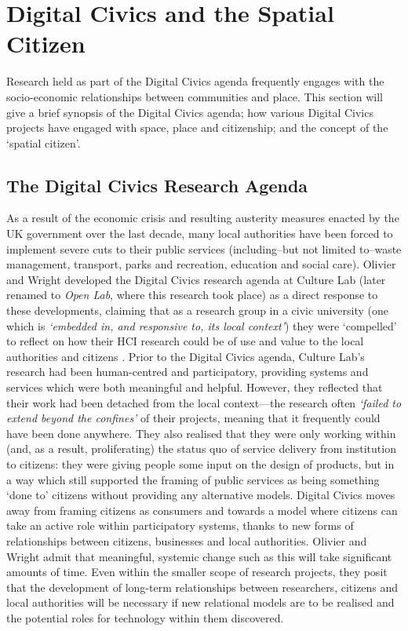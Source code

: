 \section{Digital Civics and the Spatial Citizen}
\label{sec:DigitalCivics}
Research held as part of the Digital Civics agenda frequently engages with the socio-economic relationships between communities and place. This section will give a brief synopsis of the Digital Civics agenda; how various Digital Civics projects have engaged with space, place and citizenship; and the concept of the `spatial citizen'.

\subsection{The Digital Civics Research Agenda}

As a result of the economic crisis and resulting austerity measures enacted by the UK government over the last decade, many local authorities have been forced to implement severe cuts to their public services (including--but not limited to--waste management, transport, parks and recreation, education and social care). Olivier and Wright developed the Digital Civics research agenda at Culture Lab (later renamed to \textit{Open Lab}, where this research took place) as a direct response to these developments, claiming that as a research group in a civic university (one which is \textit{`embedded in, and responsive to, its local context'}) they were `compelled' to reflect on how their HCI research could be of use and value to the local authorities and citizens \citep{Olivier2015}. Prior to the Digital Civics agenda, Culture Lab's research had been human-centred and participatory, providing systems and services which were both meaningful and helpful. However, they reflected that their work had been detached from the local context---the research often \textit{`failed to extend beyond the confines'} of their projects, meaning that it frequently could have been done anywhere. They also realised that they were only working within (and, as a result, proliferating) the status quo of service delivery from institution to citizens: they were giving people some input on the design of products, but in a way which still supported the framing of public services as being something `done to' citizens without providing any alternative models. Digital Civics moves away from framing citizens as consumers and towards a model where citizens can take an active role within participatory systems, thanks to new forms of relationships between citizens, businesses and local authorities. Olivier and Wright admit that meaningful, systemic change such as this will take significant amounts of time. Even within the smaller scope of research projects, they posit that the development of long-term relationships between researchers, citizens and local authorities will be necessary if new relational models are to be realised and the potential roles for technology within them discovered.

